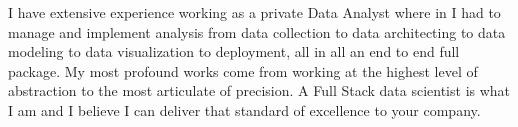 

\begin{cvparagraph}

I have extensive experience working as a private Data Analyst where in I had to manage and implement analysis from data collection to data architecting to data modeling to data visualization to deployment, all in all an end to end full package. My most profound works come from working at the highest level of abstraction to the most articulate of precision. A Full Stack data scientist is what I am and I believe I can deliver that standard of excellence to your company.
\end{cvparagraph}
